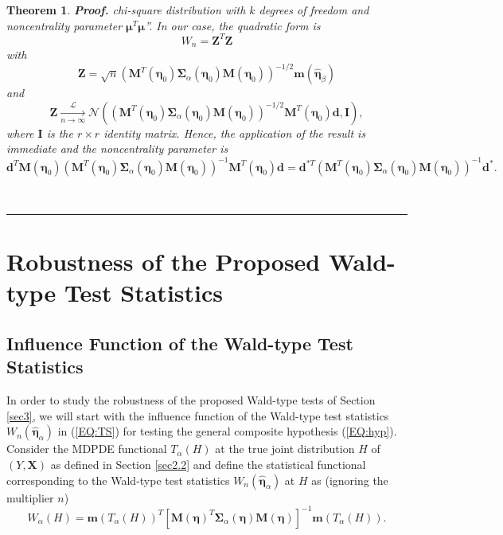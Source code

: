 \documentclass[a4paper]{article}%
\newtheorem{theorem}{Theorem}
\newenvironment{proof}[1][Proof]{\noindent \textbf{#1.} }{\  \rule{0.5em}{0.5em}}
\begin{document}
\begin{theorem}
\begin{proof}
chi-square distribution with $k$ degrees of freedom and noncentrality
parameter $\boldsymbol{\mu}^{T}\boldsymbol{\mu}$\textquotedblright.  In our
case, the quadratic form is
\[
W_{n}=\boldsymbol{Z}^{T}\boldsymbol{Z}%
\]
with
\[
\boldsymbol{Z}=\sqrt{n}\left(  \boldsymbol{M}^{T}(\boldsymbol{\eta}%
_{0})\boldsymbol{\Sigma}_{\alpha}(\boldsymbol{\eta}_{0})\boldsymbol{M}%
(\boldsymbol{\eta}_{0})\right)  ^{-1/2}\boldsymbol{m}%
(\widehat{\boldsymbol{\eta}}_{\beta})
\]
and
\[
\boldsymbol{Z}\underset{n\rightarrow\infty}{\overset{\mathcal{L}%
}{\longrightarrow}}\mathcal{N}\left(  \left(  \boldsymbol{M}^{T}%
(\boldsymbol{\eta}_{0})\boldsymbol{\Sigma}_{\alpha}(\boldsymbol{\eta}%
_{0})\boldsymbol{M}(\boldsymbol{\eta}_{0})\right)  ^{-1/2}\boldsymbol{M}%
^{T}(\boldsymbol{\eta}_{0})\boldsymbol{d},\boldsymbol{I}\right)  ,
\]
where $\boldsymbol{I}$ is the $r\times r$ identity matrix. Hence, the
application of the result is immediate and the noncentrality parameter is
\[
\boldsymbol{d}^{T}\boldsymbol{M}(\boldsymbol{\eta}_{0})\left(  \boldsymbol{M}%
^{T}(\boldsymbol{\eta}_{0})\boldsymbol{\Sigma}_{\alpha}(\boldsymbol{\eta}%
_{0})\boldsymbol{M}(\boldsymbol{\eta}_{0})\right)  ^{-1}\boldsymbol{M}%
^{T}(\boldsymbol{\eta}_{0})\boldsymbol{d}=\boldsymbol{d}^{\ast T}\left(
\boldsymbol{M}^{T}(\boldsymbol{\eta}_{0})\boldsymbol{\Sigma}_{\alpha
}(\boldsymbol{\eta}_{0})\boldsymbol{M}(\boldsymbol{\eta}_{0})\right)
^{-1}\boldsymbol{d}^{\ast}.
\]

\end{proof}
\end{theorem}

\section{Robustness of the Proposed Wald-type Test Statistics \label{sec4}}

\subsection{Influence Function of the Wald-type Test Statistics}

In order to study the robustness of the proposed Wald-type tests of Section
\ref{sec3}, we will start with the influence function of the Wald-type test
statistics $W_{n}(\widehat{\boldsymbol{\eta}}_{\alpha})$ in (\ref{EQ:TS}) for
testing the general composite hypothesis (\ref{EQ:hyp}). Consider the MDPDE
functional $T_{\alpha}(H)$ at the true joint distribution $H$ of $(Y,
\boldsymbol{X})$ as defined in Section \ref{sec2.2} and define the statistical
functional corresponding to the Wald-type test statistics $W_{n}(\widehat{\boldsymbol{\eta}}_{\alpha})$ at $H$ as
(ignoring the multiplier $n$)
\begin{equation}
W_{\alpha}(H)=\boldsymbol{m}\left(  T_{\alpha}(H)\right)  ^{T} \left[
\boldsymbol{M}\left(  \boldsymbol{\eta}\right)  ^{T}\boldsymbol{\Sigma
}_{\alpha}\left(  \boldsymbol{\eta}\right)  \boldsymbol{M}\left(
\boldsymbol{\eta}\right)  \right]  ^{-1} \boldsymbol{m}\left(  T_{\alpha
}(H)\right)  . \label{WoF}%
\end{equation}
\end{document}
